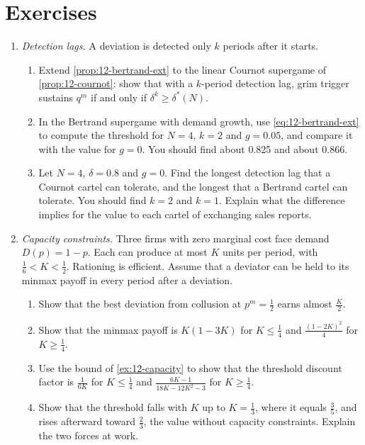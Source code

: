 \section{Exercises}\label{sec:12-exercises}

\begin{enumerate}[label=\arabic*., leftmargin=*, itemsep=6pt]

\item \textit{Detection lags.} A deviation is detected only $k$ periods after it starts.
\begin{enumerate}[label=(\alph*)]
  \item Extend \cref{prop:12-bertrand-ext} to the linear Cournot supergame of \cref{prop:12-cournot}: show that with
  a $k$-period detection lag, grim trigger sustains $q^m$ if and only if $\delta^k \ge \delta^*(N)$.
  \item In the Bertrand supergame with demand growth, use \eqref{eq:12-bertrand-ext} to compute the threshold for
  $N = 4$, $k = 2$ and $g = 0.05$, and compare it with the value for $g = 0$. You should find about 0.825 and about
  0.866.
  \item Let $N = 4$, $\delta = 0.8$ and $g = 0$. Find the longest detection lag that a Cournot cartel can tolerate,
  and the longest that a Bertrand cartel can tolerate. You should find $k = 2$ and $k = 1$. Explain what the
  difference implies for the value to each cartel of exchanging sales reports.
\end{enumerate}

\item \textit{Capacity constraints.} Three firms with zero marginal cost face demand $D(p) = 1 - p$. Each can produce
at most $K$ units per period, with $\frac{1}{6} < K < \frac{1}{2}$. Rationing is efficient. Assume that a deviator
can be held to its minmax payoff in every period after a deviation.
\begin{enumerate}[label=(\alph*)]
  \item Show that the best deviation from collusion at $p^m = \frac{1}{2}$ earns almost $\frac{K}{2}$.
  \item Show that the minmax payoff is $K(1 - 3K)$ for $K \le \frac{1}{4}$ and $\frac{(1 - 2K)^2}{4}$ for
  $K \ge \frac{1}{4}$.
  \item Use the bound of \cref{ex:12-capacity} to show that the threshold discount factor is $\frac{1}{6K}$ for
  $K \le \frac{1}{4}$ and $\frac{6K - 1}{18K - 12K^2 - 3}$ for $K \ge \frac{1}{4}$.
  \item Show that the threshold falls with $K$ up to $K = \frac{1}{3}$, where it equals $\frac{3}{5}$, and rises
  afterward toward $\frac{2}{3}$, the value without capacity constraints. Explain the two forces at work.
\end{enumerate}


\end{enumerate}
